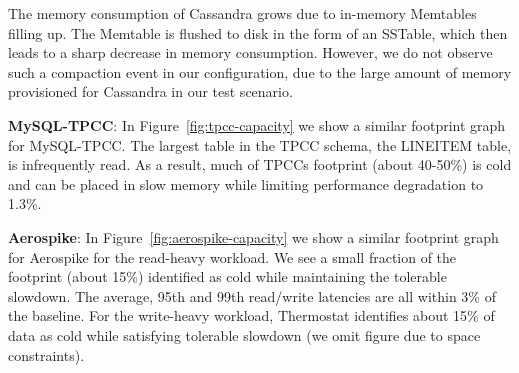 The memory consumption of Cassandra grows due to in-memory Memtables filling up.
The Memtable is flushed to disk in the form of an SSTable, which then leads to a
sharp decrease in memory consumption. However, we do not observe such a
compaction event in our configuration, due to the large amount of memory
provisioned for Cassandra in our test scenario.


\textbf{MySQL-TPCC}:
In Figure~\ref{fig:tpcc-capacity} we show a similar footprint graph for MySQL-TPCC. 
The largest table
in the TPCC schema, the LINEITEM table, is infrequently read.  As a result, much
of TPCCs footprint (about 40-50\%) is cold and can be placed in slow memory while
limiting performance degradation to 1.3\%.

\textbf{Aerospike}:
In Figure~\ref{fig:aerospike-capacity} we show a similar footprint graph for
Aerospike for the read-heavy workload. We see a small fraction of the footprint (about 15\%) identified
as cold while maintaining the tolerable slowdown. The average, 95th and 99th
read/write latencies are all within 3\% of the baseline. For the write-heavy
workload, Thermostat identifies about 15\% of data as cold while satisfying
tolerable slowdown (we omit figure due to space constraints).

